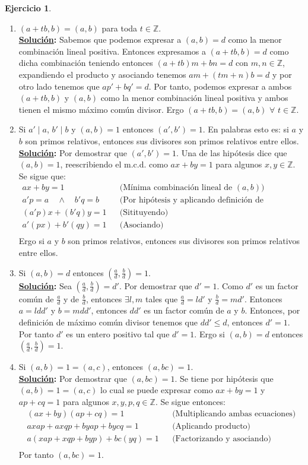 \documentclass[11pt,letterpaper]{article}
\theoremstyle{definition}\newtheorem{p}{Ejercicio}
\theoremstyle{definition}\newtheorem{pp}[p]{$(*)$Ejercicio}
\numberwithin{p}{section}
\newcommand{\Z}{\mathbb{Z}}
\newcommand{\sol}{\textbf{\underline{Solución}: }} %
\begin{document}
\begin{p}
\begin{enumerate}
  \item $(a+tb,b)=(a,b)$ para toda $t\in\Z$.\\
  \sol Sabemos que podemos expresar a $(a,b)=d$ como la menor combinación lineal positiva. Entonces 
  expresamos a  $(a+tb,b)=d$ como dicha combinación teniendo entonces $(a+tb)m + bn = d$ con $m,n \in \Z$, 
  expandiendo el producto y asociando tenemos $am + (tm+n)b = d$ y por otro lado tenemos que 
  $ap' + bq' = d$. Por tanto, podemos expresar a ambos $(a+tb,b)$ y $(a,b)$ como la menor combinación lineal 
  positiva y ambos tienen el mismo máximo común divisor. Ergo $(a+tb,b)=(a,b)$ $\forall$ $t \in\Z$.
  
  \item Si $a'\mid a$, $b'\mid b$ y $(a,b)=1$ entonces $(a',b')=1$. En palabras esto es: si $a$ y $b$ son 
  primos relativos, entonces sus divisores son primos relativos entre ellos.\\
  \sol Por demostrar que $(a',b')=1$. Una de las hipótesis dice que $(a,b)=1$, reescribiendo el m.c.d. como
  $ax+by=1$ para algunos $x,y \in \Z$. Se sigue que:
  \begin{align*}
  ax+by=1 && \text{(Mínima combinación lineal de $(a,b)$)}\\
  a'p=a \quad \land \quad b'q=b && \text{(Por hipótesis y aplicando definición de divisibilidad)}\\
  (a'p)x + (b'q)y = 1 && \text{(Sitituyendo)}\\
  a'(px) + b'(qy) = 1 && \text{(Asociando)}\\
  \end{align*}
  Ergo si $a$ y $b$ son primos relativos, entonces sus divisores son primos relativos entre ellos.
  
  \item Si $(a,b)=d$ entonces $\left( \frac{a}{d}, \frac{b}{d} \right)=1$. \\
  \sol Sea $\left( \frac{a}{d}, \frac{b}{d} \right)=d'$. Por demostrar que $d'=1$. Como $d'$ es un factor 
  común de $\frac{a}{d}$ y de $\frac{b}{d}$, entonces $\exists l, m$ tales que $\frac{a}{d} = ld'$ y 
  $\frac{b}{d} = md'$. Entonces $a = ldd'$ y $b = m dd'$, entonces $dd'$ es un factor común de $a$ y $b$. 
  Entonces, por definición de máximo común divisor tenemos que $dd' \leq d$, entonces $d' = 1$. 
  Por tanto $d'$ es un entero positivo tal que $d'=1$. Ergo si  $(a, b) = d$ entonces  
  $\left( \frac{a}{d}, \frac{b}{d} \right)=1$.
  
  \item Si $(a,b)=1=(a,c)$, entonces $(a,bc)=1$.\\
  \sol Por demostrar que $(a,bc)=1$. Se tiene por hipótesis que $(a,b)=1=(a,c)$ lo cual se puede expresar como
  $ax+by=1$ y $ap+cq=1$ para algunos $x,y,p,q \in \Z$. Se sigue entonces:
  \begin{align*}
  (ax+by)(ap+cq)=1 && \text{(Multiplicando ambas ecuaciones)}\\
  axap+axqp+byap+bycq = 1 && \text{(Aplicando producto)}\\
  a(xap+ xqp + byp) + bc(yq) = 1 && \text{(Factorizando y asociando)}\\
  \end{align*}
  Por tanto $(a,bc)=1$.
  

\end{enumerate}
\end{p}
\end{document}
